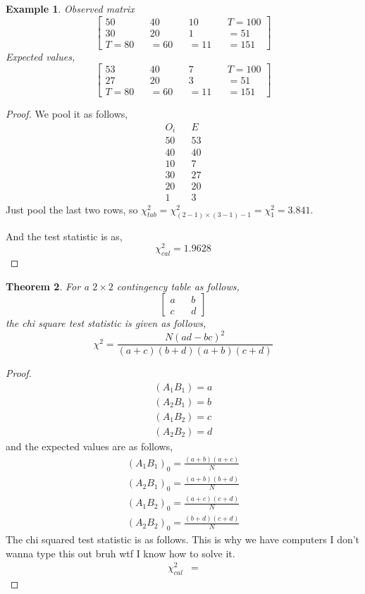 \documentclass[oneside,11pt,pdftex]{book}%
\numberwithin{equation}{section}
\newtheorem{theorem}{Theorem}[chapter]%
\newtheorem{example}[theorem]{Example}
\numberwithin{section}{chapter}
\numberwithin{equation}{chapter}
\begin{document}
\begin{example}
	Observed matrix
	\[ \begin{bmatrix}
		50 && 40 && 10 && T=100\\
		30 && 20 && 1 && =51\\
		T=80 && =60 && =11 && =151
	\end{bmatrix} \]
	Expected values,
	\[ \begin{bmatrix}
		53 && 40 && 7 && T=100\\
		27 && 20 && 3 && =51\\
		T=80 && =60 && =11 && =151
	\end{bmatrix} \]
\end{example}
\begin{proof}
	We pool it as follows,
	\[ \begin{matrix}
		O_i && E\\
		50 && 53\\
		40 && 40\\
		10 && 7\\
		30 && 27\\
		20 && 20 \\
		1 && 3
	\end{matrix} \]
Just pool the last two rows, so $ \chi^2_{tab}=\chi^2_{(2-1)\times(3-1)-1}=\chi^2_1 =3.841$.

And the test statistic is as,
\[ \chi^2_{cal}=1.9628 \]
\end{proof}

\begin{theorem}
	For a $ 2 \times 2 $ contingency table as follows,
	\[ \begin{bmatrix}
		a && b\\
		c && d
	\end{bmatrix} \]
the chi square test statistic is given as follows,
\[ \chi^2=\frac{N(ad-bc)^2}{(a+c)(b+d)(a+b)(c+d)} \]
\end{theorem}
\begin{proof}
	\begin{align*}
		(A_1B_1)=a\\
		(A_2B_1)=b\\
		(A_1B_2)=c\\
		(A_2B_2)=d
	\end{align*}
and the expected values are as follows,
\begin{align*}
	(A_1B_1)_0=\frac{(a+b)(a+c)}{N}\\
	(A_2B_1)_0=\frac{(a+b)(b+d)}{N}\\
	(A_1B_2)_0=\frac{(a+c)(c+d)}{N}\\
	(A_2B_2)_0=\frac{(b+d)(c+d)}{N}
\end{align*}
The chi squared test statistic is as follows. This is why we have computers I don't wanna type this out bruh wtf I know how to solve it.
\begin{align*}
	\chi^2_{cal}&=
\end{align*}
\end{proof}
\end{document}

